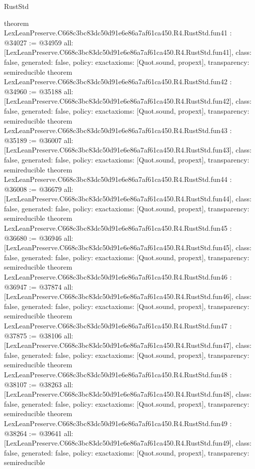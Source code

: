 \begin{lexlean}{RustStd}
\begin{coremodule}
{}
theorem LexLeanPreserve.C668c3bc83dc50d91e6e86a7af61ca450.R4.RustStd.fun41 : @34027 := @34959 {
  all: [LexLeanPreserve.C668c3bc83dc50d91e6e86a7af61ca450.R4.RustStd.fun41],
  class: false,
  generated: false,
  policy: exact{axioms: [Quot.sound, propext]},
  transparency: semireducible
}
theorem LexLeanPreserve.C668c3bc83dc50d91e6e86a7af61ca450.R4.RustStd.fun42 : @34960 := @35188 {
  all: [LexLeanPreserve.C668c3bc83dc50d91e6e86a7af61ca450.R4.RustStd.fun42],
  class: false,
  generated: false,
  policy: exact{axioms: [Quot.sound, propext]},
  transparency: semireducible
}
theorem LexLeanPreserve.C668c3bc83dc50d91e6e86a7af61ca450.R4.RustStd.fun43 : @35189 := @36007 {
  all: [LexLeanPreserve.C668c3bc83dc50d91e6e86a7af61ca450.R4.RustStd.fun43],
  class: false,
  generated: false,
  policy: exact{axioms: [Quot.sound, propext]},
  transparency: semireducible
}
theorem LexLeanPreserve.C668c3bc83dc50d91e6e86a7af61ca450.R4.RustStd.fun44 : @36008 := @36679 {
  all: [LexLeanPreserve.C668c3bc83dc50d91e6e86a7af61ca450.R4.RustStd.fun44],
  class: false,
  generated: false,
  policy: exact{axioms: [Quot.sound, propext]},
  transparency: semireducible
}
theorem LexLeanPreserve.C668c3bc83dc50d91e6e86a7af61ca450.R4.RustStd.fun45 : @36680 := @36946 {
  all: [LexLeanPreserve.C668c3bc83dc50d91e6e86a7af61ca450.R4.RustStd.fun45],
  class: false,
  generated: false,
  policy: exact{axioms: [Quot.sound, propext]},
  transparency: semireducible
}
theorem LexLeanPreserve.C668c3bc83dc50d91e6e86a7af61ca450.R4.RustStd.fun46 : @36947 := @37874 {
  all: [LexLeanPreserve.C668c3bc83dc50d91e6e86a7af61ca450.R4.RustStd.fun46],
  class: false,
  generated: false,
  policy: exact{axioms: [Quot.sound, propext]},
  transparency: semireducible
}
theorem LexLeanPreserve.C668c3bc83dc50d91e6e86a7af61ca450.R4.RustStd.fun47 : @37875 := @38106 {
  all: [LexLeanPreserve.C668c3bc83dc50d91e6e86a7af61ca450.R4.RustStd.fun47],
  class: false,
  generated: false,
  policy: exact{axioms: [Quot.sound, propext]},
  transparency: semireducible
}
theorem LexLeanPreserve.C668c3bc83dc50d91e6e86a7af61ca450.R4.RustStd.fun48 : @38107 := @38263 {
  all: [LexLeanPreserve.C668c3bc83dc50d91e6e86a7af61ca450.R4.RustStd.fun48],
  class: false,
  generated: false,
  policy: exact{axioms: [Quot.sound, propext]},
  transparency: semireducible
}
theorem LexLeanPreserve.C668c3bc83dc50d91e6e86a7af61ca450.R4.RustStd.fun49 : @38264 := @39641 {
  all: [LexLeanPreserve.C668c3bc83dc50d91e6e86a7af61ca450.R4.RustStd.fun49],
  class: false,
  generated: false,
  policy: exact{axioms: [Quot.sound, propext]},
  transparency: semireducible
}
\end{coremodule}
\end{lexlean}
